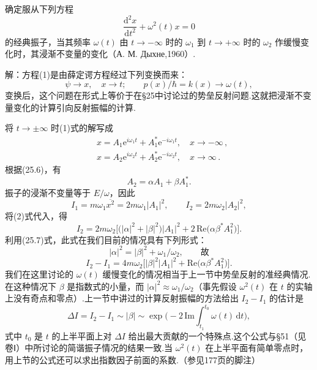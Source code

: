 \begin{xiti}

\quad 确定服从下列方程
\setcounter{equation}{0}\renewcommand{\theequation}{\arabic{equation}}%
\begin{equation}
  \frac{\mathrm{d}^2x}{\mathrm{d}t^2}+\omega^2(t)x=0
\end{equation}
的经典振子，当其频率 $\omega(t)$ 由 $t\to-\infty$ 时的 $\omega_1$ 到 $t\to+\infty$ 时的 $\omega_2$ 作缓慢变化时，其浸渐不变量的变化（А. М. Дыхне,1960）.

解：方程(1)是由薛定谔方程经过下列变换而来：
\begin{equation*}
  \psi\to x,\quad x\to t;\qquad
  p(x)/\hbar=k(x)\to\omega(t),
\end{equation*}
变换后，这个问题在形式上等价于在§25中讨论过的势垒反射问题.这就把浸渐不变量变化的计算引向反射振幅的计算.

将 $t\to\pm\infty$ 时(1)式的解写成
\begin{equation*}
\begin{aligned}
  &x=A_1\mathrm{e}^{i\omega_1t}+A_1^*\mathrm{e}^{-i\omega_1t},
  \quad x\to-\infty\,,\\
  &x=A_2\mathrm{e}^{i\omega_2t}+A_2^*\mathrm{e}^{-i\omega_2t},
  \quad x\to\infty\,.
\end{aligned}
\end{equation*}
根据(25.6)，有
\begin{equation}
  A_2=\alpha A_1+\beta A_1^*.
\end{equation}
振子的浸渐不变量等于 $E/\omega$，因此
\begin{equation*}
  I_1=m\omega_1\overline{x^2}=2m\omega_1|A_1|^2,\qquad
  I_2=2m\omega_2|A_2|^2,
\end{equation*}
将(2)式代入，得
\begin{equation*}
  I_2=2m\omega_2\bigl[\bigl(|\alpha|^2+|\beta|^2\bigr)|A_1|^2
  +2\,\mathrm{Re}\bigl(\alpha\beta^*A_1^2\bigr)\bigr].
\end{equation*}
利用(25.7)式，此式在我们目前的情况具有下列形式：
\begin{equation*}
  |\alpha|^2=|\beta|^2+\omega_1/\omega_2,\qquad\text{故}
\end{equation*}
\begin{equation}
  I_2-I_1=4m\omega_2\bigl[|\beta|^2|A_1|^2
  +\mathrm{Re}\bigl(\alpha\beta^*A_1^2\bigr)\bigr].
\end{equation}
我们在这里讨论的 $\omega(t)$ 缓慢变化的情况相当于上一节中势垒反射的准经典情况.在这种情况下 $\beta$ 是指数式的小量，而 $|\alpha|^2\approx\omega_1/\omega_2$（事先假设 $\omega^2(t)$ 在 $t$ 的实轴上没有奇点和零点）.上一节中讲过的计算反射振幅的方法给出 $I_2-I_1$ 的估计是
\begin{equation*}
  \Delta I=I_2-I_1\sim|\beta|
  \sim\exp\bigg(-2\,\mathrm{Im}\int_{t_1}^{t_0}\omega(t)\,\mathrm{d}t\bigg),
\end{equation*}
式中 $t_0$ 是 $t$ 的上半平面上对 $\Delta I$ 给出最大贡献的一个特殊点.这个公式与§51（见卷Ⅰ）中所讨论的简谐振子情况的结果一致.当 $\omega^2(t)$ 在上半平面有简单零点时，用上节的公式还可以求出指数因子前面的系数.（参见177页的脚注）


\end{xiti}

